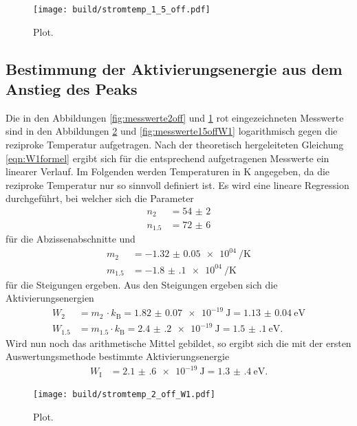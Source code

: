\begin{figure}
  \centering
  \texttt{[image: build/stromtemp\_1\_5\_off.pdf]}
  \caption{Plot.}
  \label{fig:messwerte15off}
\end{figure}

\subsection{Bestimmung der Aktivierungsenergie aus dem Anstieg des Peaks}

Die in den Abbildungen \ref{fig:messwerte2off} und \ref{fig:messwerte15off} rot
eingezeichneten Messwerte sind in den Abbildungen \ref{fig:messwerte2offW1} und
\ref{fig:messwerte15offW1} logarithmisch gegen die reziproke Temperatur
aufgetragen. Nach der theoretisch hergeleiteten Gleichung \eqref{eqn:W1formel}
ergibt sich für die entsprechend aufgetragenen Messwerte ein linearer Verlauf.
Im Folgenden werden Temperaturen in $\si{\kelvin}$ angegeben, da die reziproke
Temperatur nur so sinnvoll definiert ist. Es wird eine lineare Regression durchgeführt,
bei welcher sich die Parameter
\begin{align}
  n_{2} &= \num{54(2)} \\
  n_{1.5} &= \num{72(6)}
\end{align}
für die Abzissenabschnitte und
\begin{align}
  m_{2} &= \SI{-1.32(5)e04}{\per\kelvin} \\
  m_{1.5} &= \SI{-1.8(1)e04}{\per\kelvin}
\end{align}
für die Steigungen ergeben. Aus den Steigungen ergeben sich die Aktivierungsenergien
\begin{align}
  W_{2} &= m_{2} \, \cdot k_\text{B} = \SI{1.82(7)e-19}{\joule} = \SI{1.13(4)}{\electronvolt} \\
  W_{1.5} &= m_{1.5} \cdot k_\text{B} = \SI{2.4(2)e-19}{\joule} = \SI{1.5(1)}{\electronvolt}.
\end{align}
Wird nun noch das arithmetische Mittel gebildet, so ergibt sich die mit der ersten
Auswertungsmethode bestimmte Aktivierungsenergie
\begin{align}
  W_{\text{I}} &= \SI{2.1(6)e-19}{\joule} = \SI{1.3(4)}{\electronvolt}.
\end{align}

\begin{figure}
  \centering
  \texttt{[image: build/stromtemp\_2\_off\_W1.pdf]}
  \caption{Plot.}
  \label{fig:messwerte2offW1}
\end{figure}

